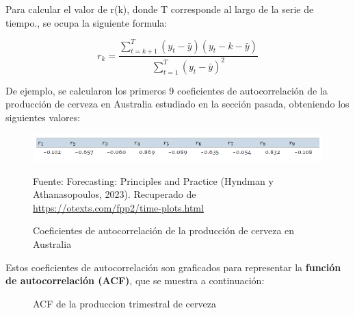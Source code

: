 \begin{itemize}
    Para calcular el valor de r(k), donde T corresponde al largo de la serie de tiempo., se ocupa la siguiente formula:

    \begin{equation*}
        r_k = \frac{\sum_{t=k+1}^{T}{(y_t - \bar{y})(y_t-k - \bar{y})}}{\sum_{t=1}^{T}(y_t - \bar{y})^2}
    \end{equation*}  

    De ejemplo, se calcularon los primeros 9 coeficientes de autocorrelación de la producción de cerveza en Australia estudiado en la sección pasada, obteniendo los siguientes valores:

    \begin{figure}[H]
        \begin{minipage}[t]{0.9\textwidth}
            \caption{Coeficientes de autocorrelación de la producción de cerveza en Australia}
            \label{autocorrelaciones1}        
        \end{minipage}
    
        \vspace{10pt}
    
        \begin{minipage}[b]{1.1\textwidth}
            \centering
            \includegraphics[width=\textwidth]{img/ejemplo_autocorrelaciones.png}        
        \end{minipage}
    
        \begin{minipage}[t]{0.9\textwidth}
            Fuente: Forecasting: Principles and Practice (Hyndman y Athanasopoulos, 2023). Recuperado de \url{https://otexts.com/fpp2/time-plots.html}
        \end{minipage}
    \end{figure}

    Estos coeficientes de autocorrelación son graficados para representar la \textbf{función de autocorrelación (ACF)}, que se muestra a continuación:

    \begin{figure}[H]
        \begin{minipage}[t]{0.9\textwidth}
            \caption{ACF de la produccion trimestral de cerveza}
            \label{autocorrelaciones2}        
        \end{minipage}
    

\end{figure}
\end{itemize}
